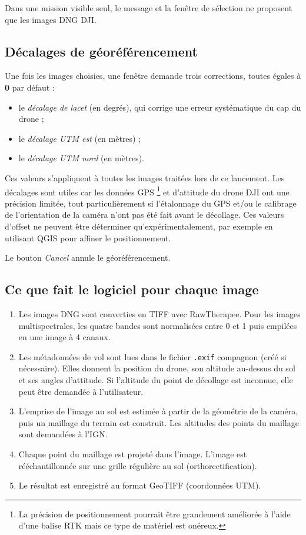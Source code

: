 \documentclass[a4paper,11pt]{report}
\begin{document}
Dans une mission visible seul, le message et la fenêtre de sélection ne proposent que les images DNG DJI.

\subsection*{Décalages de géoréférencement}
Une fois les images choisies, une fenêtre demande trois corrections, toutes égales à \textbf{0} par défaut :
\begin{itemize}
	\item le \emph{décalage de lacet} (en degrés), qui corrige une erreur systématique du cap du drone ;
	\item le \emph{décalage UTM est} (en mètres) ;
	\item le \emph{décalage UTM nord} (en mètres).
\end{itemize}

Ces valeurs s'appliquent à toutes les images traitées lors de ce lancement. Les décalages sont utiles car les données GPS
\footnote{La précision de positionnement pourrait être grandement améliorée à l'aide d'une balise RTK mais ce type de matériel est onéreux.} et d'attitude du drone DJI ont une précision limitée, tout particulièrement si l'étalonnage du GPS et/ou le calibrage de l'orientation de la caméra n'ont pas été fait avant le décollage. Ces valeurs \og d'offset \fg ne peuvent être déterminer qu'expérimentalement, par exemple en utilisant QGIS pour affiner le positionnement. 

 Le bouton \emph{Cancel} annule le géoréférencement.

\subsection*{Ce que fait le logiciel pour chaque image}
\begin{enumerate}
	\item Les images DNG sont converties en TIFF avec RawTherapee. Pour les images multispectrales, les quatre bandes sont normalisées entre 0 et 1 puis empilées en une image à 4 canaux.
	\item Les métadonnées de vol sont lues dans le fichier \texttt{.exif} compagnon (créé si nécessaire). Elles donnent la position du drone, son altitude au-dessus du sol et ses angles d'attitude. Si l'altitude du point de décollage est inconnue, elle peut être demandée à l'utilisateur.
	\item L'emprise de l'image au sol est estimée à partir de la géométrie de la caméra, puis un maillage du terrain est construit. Les altitudes des points du maillage sont demandées à l'IGN.
	\item Chaque point du maillage est projeté dans l'image. L'image est rééchantillonnée sur une grille régulière au sol (orthorectification).
	\item Le résultat est enregistré au format GeoTIFF (coordonnées UTM).
\end{enumerate}
\end{document}
